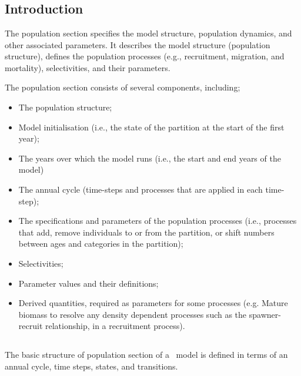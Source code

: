 \section{\label{sec:population-section}}

\subsection{Introduction}
The population section specifies the model structure, population dynamics, and other associated parameters. It describes the model structure (population structure), defines the population processes (e.g., recruitment, migration, and mortality), selectivities, and their parameters.

The population section consists of several components, including;
\begin{itemize}
  \item The population structure;
  \item Model initialisation (i.e., the state of the partition at the start of the first year);
  \item The years over which the model runs (i.e., the start and end years of the model)
  \item The annual cycle (time-steps and processes that are applied in each time-step);
  \item The specifications and parameters of the population processes (i.e., processes that add, remove individuals to or from the partition, or shift numbers between ages and categories in the partition);
  \item Selectivities;
  \item Parameter values and their definitions;
  \item Derived quantities, required as parameters for some processes (e.g. Mature biomass to resolve any density dependent processes such as the spawner-recruit relationship, in a recruitment process).
\end{itemize}

\subsection{}

The basic structure of population section of a \CNAME\ model is defined in terms of an annual cycle, time steps, states, and transitions.

